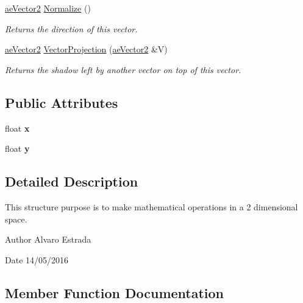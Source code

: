 \begin{DoxyCompactItemize}
\hyperlink{structae_core_1_1ae_vector2}{ae\+Vector2} \hyperlink{structae_core_1_1ae_vector2_a1e35d976770bb33f7c71610d60f39b57}{Normalize} ()
\begin{DoxyCompactList}\small\item\em Returns the direction of this vector. \end{DoxyCompactList}\item 
\hyperlink{structae_core_1_1ae_vector2}{ae\+Vector2} \hyperlink{structae_core_1_1ae_vector2_ae625d90bf8198595928663434dd24a87}{Vector\+Projection} (\hyperlink{structae_core_1_1ae_vector2}{ae\+Vector2} \&V)
\begin{DoxyCompactList}\small\item\em Returns the shadow left by another vector on top of this vector. \end{DoxyCompactList}\end{DoxyCompactItemize}
\subsection*{Public Attributes}
\begin{DoxyCompactItemize}
\item 
float {\bfseries x}\hypertarget{structae_core_1_1ae_vector2_a0e26a2527248bad24e9e2fcb451c381e}{}\label{structae_core_1_1ae_vector2_a0e26a2527248bad24e9e2fcb451c381e}

\item 
float {\bfseries y}\hypertarget{structae_core_1_1ae_vector2_acdd8de4847b1b8f2ff340bc00a646a62}{}\label{structae_core_1_1ae_vector2_acdd8de4847b1b8f2ff340bc00a646a62}

\end{DoxyCompactItemize}


\subsection{Detailed Description}
This structure purpose is to make mathematical operations in a 2 dimensional space. 

\begin{DoxyAuthor}{Author}
Alvaro Estrada 
\end{DoxyAuthor}
\begin{DoxyDate}{Date}
14/05/2016 
\end{DoxyDate}


\subsection{Member Function Documentation}
